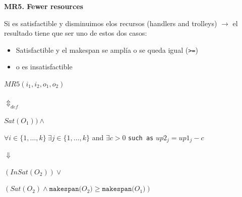 \begin{framed}
    
\textbf{MR5. Fewer resources}

Si es satisfactible y disminuimos elos recursos  (handlers and trolleys)  $\rightarrow$  el resultado tiene que ser uno de estos dos casos: 
\begin{itemize}
    \item Satisfactible y el makespan se amplía o se queda igual (\texttt{>=})
    \item o es insatisfactible  
\end{itemize}
\end{framed}

\begin{framed}
\begin{center}
$MR5(i_1,i_2,o_1,o_2)$

$ \Updownarrow_{def}$

$Sat (O_1)) \wedge$ 

$\forall i \in \{1,\dots,k\} \ \exists j \in \{1,\dots,k\}$ and $\exists c >0$ \texttt{such as} $up2_j = up1_j - c $  

$\Downarrow$

$(InSat(O_2)) \vee $

$(Sat(O_2) \wedge \texttt{makespan($O_2$)} \geq \texttt{makespan($O_1$)}) $
\end{center}
\end{framed}





